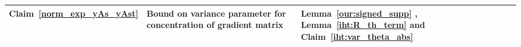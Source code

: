 \documentclass{article}
\begin{document}
\begin{table}[!h]
\begin{minipage}{0.5\textwidth}
{\begin{tabular}{c|p{4.5cm}|p{2cm}}
		Claim~\ref{norm_exp_yAs_yAst} &Bound on variance parameter for concentration of gradient matrix& Lemma~\ref{our:signed_supp} , Lemma~\ref{iht:R_th_term} and Claim~\ref{iht:var_theta_abs}\\ \hline
	\end{tabular}}
	\end{minipage}
	\begin{minipage}{0.7\textwidth}
	\end{minipage}
\end{table}
\end{document}
